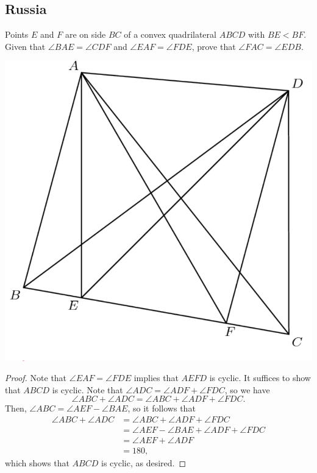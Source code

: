 \documentclass[12pt]{scrartcl}
\newcommand{\<}{\langle}
\renewcommand{\>}{\rangle}
\begin{document}
\subsection{Russia}
\begin{Prob}[Russia] Points $E$ and $F$ are on side $BC$ of a convex quadrilateral $ABCD$ with $BE<BF$.  Given that $\angle BAE = \angle CDF$ and $\angle EAF = \angle FDE$, prove that $\angle FAC = \angle EDB$.
\end{Prob}
\begin{center}
\includegraphics[scale=0.4]{graphics/p2-2.png}
\end{center}
\begin{proof}
Note that $\angle EAF = \angle FDE$ implies that $AEFD$ is cyclic.  It suffices to show that $ABCD$ is cyclic.  Note that $\angle ADC = \angle ADF + \angle FDC$, so we have 
$$\angle ABC + \angle ADC = \angle ABC + \angle ADF + \angle FDC.$$
Then, $\angle ABC = \angle AEF - \angle BAE$, so it follows that 
\begin{align*}
\angle ABC + \angle ADC &= \angle ABC + \angle ADF + \angle FDC \\
&= \angle AEF - \angle BAE + \angle ADF + \angle FDC \\
&= \angle AEF + \angle ADF \\
&= 180,
\end{align*}
which shows that $ABCD$ is cyclic, as desired.
\end{proof}
\end{document}
